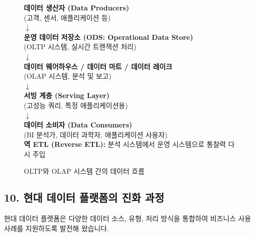 \documentclass[11pt,a4paper]{article}
\theoremstyle{definition}
\begin{document}
\begin{figure}[h!]
    \centering
    \begin{tcolorbox}[colback=gray!10, colframe=gray!50!black, title={OLTP 및 OLAP 시스템의 데이터 흐름 (개념도)}]
        \centering
        \textbf{데이터 생산자 (Data Producers)} \\
        (고객, 센서, 애플리케이션 등) \\
        $\downarrow$ \\
        \textbf{운영 데이터 저장소 (ODS: Operational Data Store)} \\
        (OLTP 시스템, 실시간 트랜잭션 처리) \\
        $\downarrow$ \\
        \textbf{데이터 웨어하우스 / 데이터 마트 / 데이터 레이크} \\
        (OLAP 시스템, 분석 및 보고) \\
        $\downarrow$ \\
        \textbf{서빙 계층 (Serving Layer)} \\
        (고성능 쿼리, 특정 애플리케이션용) \\
        $\downarrow$ \\
        \textbf{데이터 소비자 (Data Consumers)} \\
        (BI 분석가, 데이터 과학자, 애플리케이션 사용자) \\
        \textbf{역 ETL (Reverse ETL):} 분석 시스템에서 운영 시스템으로 통찰력 다시 주입
    \end{tcolorbox}
    \caption{OLTP와 OLAP 시스템 간의 데이터 흐름}
    \label{fig:oltp_olap_flow}
\end{figure}

\subsection*{10. 현대 데이터 플랫폼의 진화 과정}

현대 데이터 플랫폼은 다양한 데이터 소스, 유형, 처리 방식을 통합하여 비즈니스 사용 사례를 지원하도록 발전해 왔습니다.
\end{document}
